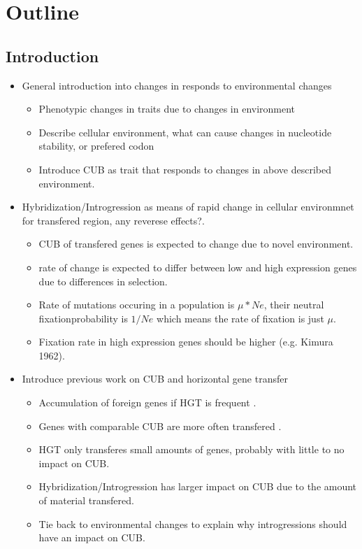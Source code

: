 \documentclass[12pt]{article}
\begin{document}
\section*{Outline}
\subsection*{Introduction}
\begin{itemize}
	\item General introduction into changes in responds to environmental changes
	\begin{itemize}
		\item Phenotypic changes in traits due to changes in environment
		\item Describe cellular environment, what can cause changes in nucleotide stability, or prefered codon
		\item Introduce CUB as trait that responds to changes in above described environment.
	\end{itemize}
	\item Hybridization/Introgression as means of rapid change in cellular environmnet for transfered region, any reverese effects?.
	\begin{itemize}
		\item CUB of transfered genes is expected to change due to novel environment.
		\item rate of change is expected to differ between low and high expression genes due to differences in selection.
		\item Rate of mutations occuring in a population is $\mu*Ne$, their neutral fixationprobability is $1/Ne$ which means the rate of fixation is just $\mu$. 
		\item Fixation rate in high expression genes should be higher (e.g. Kimura 1962).
	\end{itemize}
	\item Introduce previous work on CUB and horizontal gene transfer
	\begin{itemize}
		\item Accumulation of foreign genes if HGT is frequent \citep{lawrence1997}.
		\item Genes with comparable CUB are more often transfered \citep{tuller2011}.
		\item HGT only transferes small amounts of genes, probably with little to no impact on CUB.
		\item Hybridization/Introgression has larger impact on CUB due to the amount of material transfered.
		\item Tie back to environmental changes to explain why introgressions should have an impact on CUB.

\end{itemize}
\end{itemize}
\end{document}
